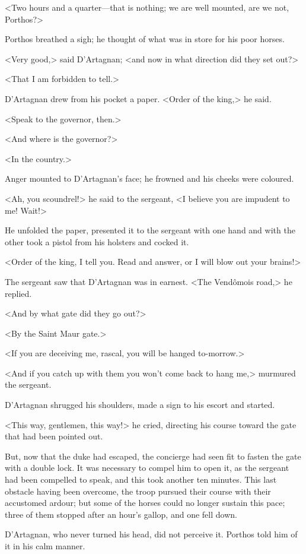 <Two hours and a quarter—that is nothing; we are well mounted, are we not, Porthos?>

Porthos breathed a sigh; he thought of what was in store for his poor horses.

<Very good,> said D'Artagnan; <and now in what direction did they set out?>

<That I am forbidden to tell.>

D'Artagnan drew from his pocket a paper. <Order of the king,> he said.

<Speak to the governor, then.>

<And where is the governor?>

<In the country.>

Anger mounted to D'Artagnan's face; he frowned and his cheeks were coloured.

<Ah, you scoundrel!> he said to the sergeant, <I believe you are impudent to me! Wait!>

He unfolded the paper, presented it to the sergeant with one hand and with the other took a pistol from his holsters and cocked it.

<Order of the king, I tell you. Read and answer, or I will blow out your brains!>

The sergeant saw that D'Artagnan was in earnest. <The Vendômois road,> he replied.

<And by what gate did they go out?>

<By the Saint Maur gate.>

<If you are deceiving me, rascal, you will be hanged to-morrow.>

<And if you catch up with them you won't come back to hang me,> murmured the sergeant.

D'Artagnan shrugged his shoulders, made a sign to his escort and started.

<This way, gentlemen, this way!> he cried, directing his course toward the gate that had been pointed out.

But, now that the duke had escaped, the concierge had seen fit to fasten the gate with a double lock. It was necessary to compel him to open it, as the sergeant had been compelled to speak, and this took another ten minutes. This last obstacle having been overcome, the troop pursued their course with their accustomed ardour; but some of the horses could no longer sustain this pace; three of them stopped after an hour's gallop, and one fell down.

D'Artagnan, who never turned his head, did not perceive it. Porthos told him of it in his calm manner.

